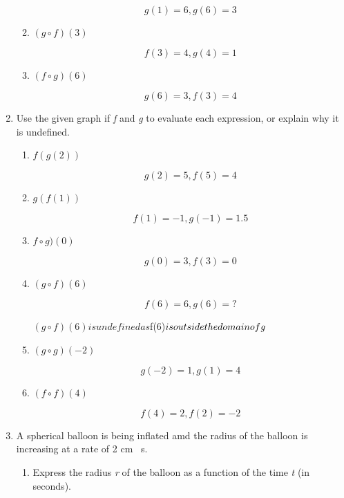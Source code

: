 \documentclass{article}
\begin{document}
\begin{enumerate}
\begin{enumerate}
						$$g(1) = 6, g(6) = 3$$

					\item $(g \circ f)(3)$
					
						$$f(3) = 4, g(4) = 1$$
						
					\item $(f \circ g)(6)$
					
						$$g(6) = 3, f(3) = 4$$
					
						
				\end{enumerate}
				
				\item Use the given graph if \emph{f} and \emph{g} to evaluate each expression,
					or explain why it is undefined.
					
				\begin{enumerate}
				
					\item $f(g(2))$
					
					$$g(2) = 5, f(5) = 4$$
					
					\item $g(f(1))$
					
					$$f(1) = -1, g(-1) = 1.5$$
					
					\item $f \circ g)(0)$
					
					$$g(0) = 3, f(3) = 0$$
					
					\item $(g \circ f)(6)$
					
					$$f(6) = 6, g(6) = ?$$
					
					$(g \circ f)(6) is undefined as $f(6)$ is outside the domain of \emph{g}$
					
					\item $(g \circ g)(-2)$
					
					$$g(-2) = 1, g(1) = 4$$
					
					\item $(f \circ f)(4)$
					
					$$f(4) = 2, f(2) = -2$$
					
						
				\end{enumerate}
		\item A spherical balloon is being inflated amd the radius of the balloon is increasing at a rate of 2 cm \ s.
		
		\begin{enumerate}
		
			\item Express the radius \emph{r} of the balloon as a function of the time \emph{t} (in seconds).
			

\end{enumerate}
\end{enumerate}
\end{document}
